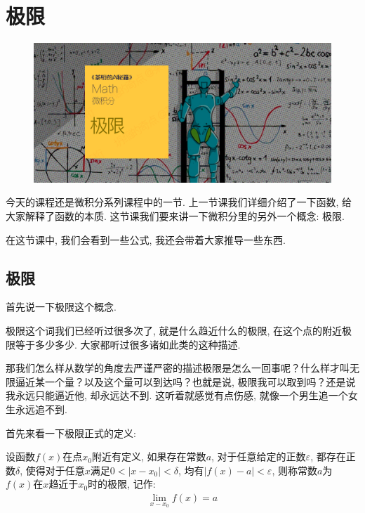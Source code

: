 \chapter{极限}

\begin{figure}[ht]
  \centering
  \includegraphics[width=1\textwidth]{asset/20230827220554.png}
\end{figure}

\newpage

今天的课程还是微积分系列课程中的一节. 上一节课我们详细介绍了一下函数, 给大家解释了函数的本质. 这节课我们要来讲一下微积分里的另外一个概念: 极限. 

在这节课中, 我们会看到一些公式, 我还会带着大家推导一些东西. 

\section{极限}

首先说一下极限这个概念. 

极限这个词我们已经听过很多次了, 就是什么趋近什么的极限, 在这个点的附近极限等于多少多少. 大家都听过很多诸如此类的这种描述. 

那我们怎么样从数学的角度去严谨严密的描述极限是怎么一回事呢？什么样才叫无限逼近某一个量？以及这个量可以到达吗？也就是说, 极限我可以取到吗？还是说我永远只能逼近他, 却永远达不到. 这听着就感觉有点伤感, 就像一个男生追一个女生永远追不到.

首先来看一下极限正式的定义: 

\begin{newquotation}
  设函数$f(x)$在点$x_0$附近有定义, 如果存在常数$a$, 对于任意给定的正数$\varepsilon$, 都存在正数$\delta$, 使得对于任意$x$满足$0<|x-x_0| < \delta$, 均有$|f(x)-a| < \varepsilon$, 则称常数$a$为$f(x)$在$x$趋近于$x_0$时的极限, 记作: 
  \begin{align*}
    \lim_{x-x_0}f(x) = a
  \end{align*}
\end{newquotation}

